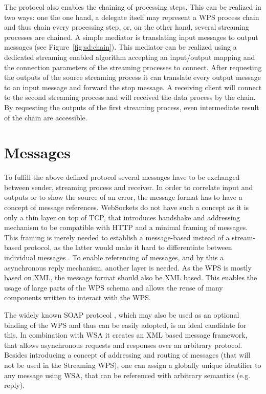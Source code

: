 	The protocol also enables the chaining of processing steps. This can be realized in two ways: one the one hand, a delegate itself may represent a \ac{WPS} process chain and thus chain every processing step, or, on the other hand, several streaming processes are chained. A simple mediator is translating input messages to output messages (see Figure~\ref{fig:sd:chain}). This mediator can be realized using a dedicated streaming enabled algorithm accepting an input/output mapping and the connection parameters of the streaming processes to connect. After requesting the outputs of the source streaming process it can translate every output message to an input message and forward the stop message. A receiving client will connect to the second streaming process and will received the data process by the chain. By requesting the outputs of the first streaming process, even intermediate result of the chain are accessible.

	\section{Messages}
		\label{sec:streaming:messages}
		To fulfill the above defined protocol several messages have to be exchanged between sender, streaming process and receiver. In order to correlate input and outputs or to show the source of an error, the message format has to have a concept of message references. WebSockets do not have such a concept as it is only a thin layer on top of TCP, that introduces handshake and addressing mechanism to be compatible with HTTP and a minimal framing of messages. This framing is merely needed to establish a message-based instead of a stream-based protocol, as the latter would make it hard to differentiate between individual messages \citep{ietf:rfc6455}. To enable referencing of messages, and by this a asynchronous reply mechanism, another layer is needed. As the \ac{WPS} is mostly based on \ac{XML}, the message format should also be \ac{XML} based. This enables the usage of large parts of the \ac{WPS} schema and allows the reuse of many components written to interact with the \ac{WPS}.

		The widely known SOAP protocol \citep{w3c:soap1}, which may also be used as an optional binding of the \ac{WPS} \citep{ogc:wps} and thus can be easily adopted, is an ideal candidate for this. In combination with \ac{WSA} \citep{w3c:wsa} it creates an \ac{XML} based message framework, that allows asynchronous requests and responses over an arbitrary protocol. Besides introducing a concept of addressing and routing of messages (that will not be used in the Streaming \ac{WPS}), one can assign a globally unique identifier to any message using \ac{WSA}, that can be referenced with arbitrary semantics (e.g. reply).

